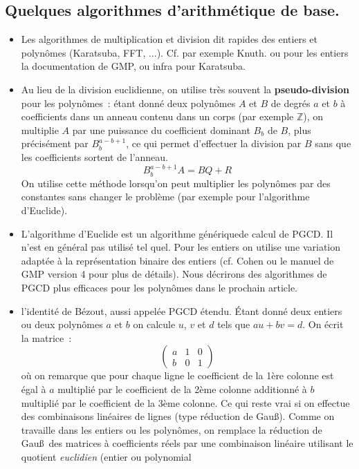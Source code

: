 \documentclass[a4paper,11pt]{article}
\newcommand{\Z}{{\mathbb{Z}}}
\begin{document}
\subsection{Quelques algorithmes d'arithmétique de base.}
\begin{itemize}
\item Les algorithmes de multiplication et division dit rapides
des entiers et polyn\^omes (Karatsuba, FFT, ...). Cf. par exemple Knuth.
ou pour les entiers la documentation de GMP, ou infra pour Karatsuba.
\item Au lieu de la division euclidienne, on utilise très souvent la
{\bf pseudo-division} pour les polynômes~: étant donné deux polyn\^omes $A$
et $B$ de degrés $a$ et $b$ à coefficients dans un anneau contenu dans un corps
(par exemple $\Z$), on multiplie $A$ par une puissance du coefficient
dominant $B_b$ de $B$, plus précisément par $B_b^{a-b+1}$, ce qui permet 
d'effectuer la division par $B$ sans que
les coefficients sortent de l'anneau.
\[ B_b^{a-b+1} A= B Q + R \]
On utilise cette méthode lorsqu'on peut multiplier les polyn\^omes par
des constantes sans changer le problème (par exemple pour l'algorithme
d'Euclide).
\item L'algorithme d'Euclide est un algorithme \og générique\fg de calcul
de PGCD. Il n'est en général pas utilisé tel quel. Pour les entiers 
on utilise une variation adaptée à la
représentation binaire des entiers (cf. Cohen ou le manuel de GMP version 4 
pour plus de détails). Nous décrirons des
algorithmes de PGCD plus efficaces pour les polynômes dans le prochain article.
\item l'identité de Bézout, aussi appelée PGCD étendu. \'Etant donné
deux entiers ou deux polyn\^omes $a$ et $b$ on calcule $u$, $v$ et
$d$ tels que $au+bv=d$. On écrit la matrice~:
\[ \left( \begin{array}{lll}
a & 1 & 0 \\
b & 0 & 1
\end{array} \right) \]
où on remarque que pour chaque ligne le coefficient de la 1ère colonne 
est égal à $a$ multiplié par le coefficient de la
2ème colonne additionné à $b$ multiplié par le coefficient de la 
3ème colonne. Ce qui reste vrai si on effectue des
combinaisons linéaires de lignes (type réduction de Gau\ss). 
Comme on travaille dans les entiers ou les polyn\^omes, on remplace la
réduction de Gau\ss\ des matrices à coefficients réels par une combinaison 
linéaire utilisant le quotient {\em euclidien\/} (entier ou polynomial

\end{itemize}
\end{document}
